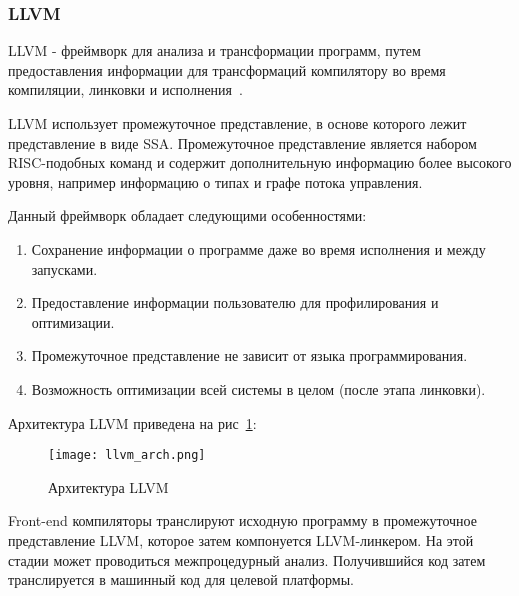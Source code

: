\subsubsection{LLVM}


LLVM - фреймворк для анализа и трансформации программ, путем предоставления
информации для трансформаций компилятору во время компиляции, линковки и
исполнения~\cite{llvm}.

LLVM использует промежуточное представление, в основе которого лежит
представление в виде SSA. Промежуточное представление является набором
RISC-подобных команд и содержит дополнительную информацию более высокого уровня,
например информацию о типах и графе потока управления.

Данный фреймворк обладает следующими особенностями:

\begin{enumerate}
    \item Сохранение информации о программе даже во время исполнения и между
    запусками.
    \item Предоставление информации пользователю для профилирования и
    оптимизации.
    \item Промежуточное представление не зависит от языка программирования.
    \item Возможность оптимизации всей системы в целом (после этапа линковки).
\end{enumerate}

Архитектура LLVM приведена на рис~\ref{fig:llvm_arch}:

\newpage

\begin{figure}[ht!]
    \begin{center}
        \texttt{[image: llvm\_arch.png]}
    \end{center}
    \caption{Архитектура LLVM}
    \label{fig:llvm_arch}
\end{figure}

Front-end компиляторы транслируют исходную программу в промежуточное
представление LLVM, которое затем компонуется LLVM-линкером. На этой стадии
может проводиться межпроцедурный анализ. Получившийся код затем транслируется
в машинный код для целевой платформы.

